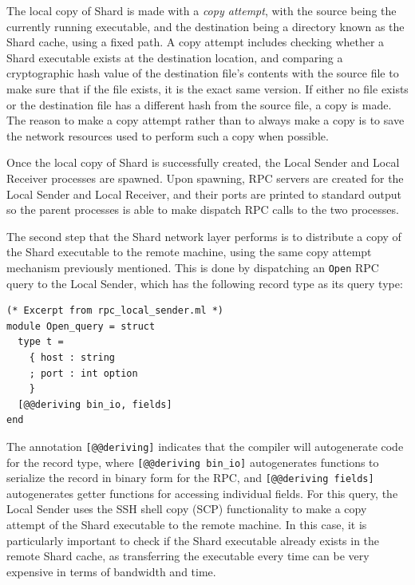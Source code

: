 \documentclass[twoside]{report}
\begin{document}
The local copy of Shard is made with a \textit{copy attempt}, with the source being the currently running executable, and the destination being a directory known as the Shard cache, using a fixed path.
A copy attempt includes checking whether a Shard executable exists at the destination location, and comparing a cryptographic hash value of the destination file's contents with the source file to make sure that if the file exists, it is the exact same version.
If either no file exists or the destination file has a different hash from the source file, a copy is made.
The reason to make a copy attempt rather than to always make a copy is to save the network resources used to perform such a copy when possible.

Once the local copy of Shard is successfully created, the Local Sender and Local Receiver processes are spawned.
Upon spawning, RPC servers are created for the Local Sender and Local Receiver, and their ports are printed to standard output so the parent processes is able to make dispatch RPC calls to the two processes.

The second step that the Shard network layer performs is to distribute a copy of the Shard executable to the remote machine, using the same copy attempt mechanism previously mentioned.
This is done by dispatching an \texttt{Open} RPC query to the Local Sender, which has the following record type as its query type:

\begin{minipage}[c]{\textwidth-15pt}
  \begin{lstlisting}
(* Excerpt from rpc_local_sender.ml *)
module Open_query = struct
  type t =
    { host : string
    ; port : int option
    }
  [@@deriving bin_io, fields]
end
\end{lstlisting}
  \smallskip
\end{minipage}

The annotation \texttt{[@@deriving]} indicates that the compiler will autogenerate code for the record type, where \texttt{[@@deriving bin\_io]} autogenerates functions to serialize the record in binary form for the RPC, and \texttt{[@@deriving fields]} autogenerates getter functions for accessing individual fields.
For this query, the Local Sender uses the SSH shell copy (SCP) functionality to make a copy attempt of the Shard executable to the remote machine.
In this case, it is particularly important to check if the Shard executable already exists in the remote Shard cache, as transferring the executable every time can be very expensive in terms of bandwidth and time.
\end{document}
